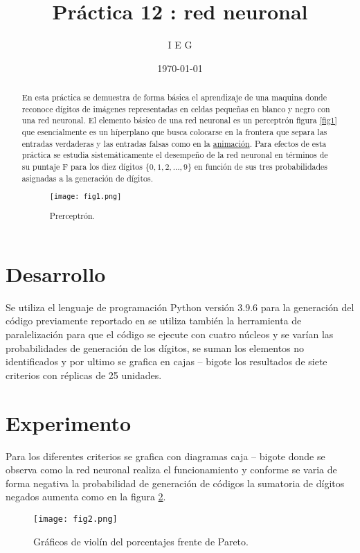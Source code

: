 \documentclass{article}
\author{I E G} %
\title{Práctica 12 : red neuronal} %
\date{\today}
\begin{document}

\maketitle %

\begin{abstract} %

En esta práctica se demuestra de forma básica el aprendizaje de una maquina donde reconoce dígitos de imágenes representadas en celdas pequeñas en blanco y negro con una red neuronal.
El elemento básico de una red neuronal es un perceptrón figura \ref{fig1} que esencialmente es un híperplano \cite{elis12} que busca colocarse en la frontera que separa las entradas verdaderas y las entradas falsas como en la \href{https://github.com/IsaacEstrada159/simulacion/blob/master/p12/p12p.gif}{animación}. Para efectos de esta práctica se estudia sistemáticamente el desempeño de la red neuronal en términos de su puntaje F para los diez dígitos $\{0, 1, 2, \ldots, 9\}$ en función de sus tres probabilidades asignadas a la generación de dígitos.



\begin{figure} [h!]%
    \centering
    \texttt{[image: fig1.png]} %
    \caption{Prerceptrón.}
    \label{fig1}
\end{figure}

\end{abstract}


\section{Desarrollo}
Se utiliza el lenguaje de programación Python versión 3.9.6 para la generación del código previamente reportado en \cite{elis12} se utiliza también la herramienta de paralelización para que el código se ejecute con cuatro núcleos y se varían las probabilidades de generación de los dígitos, se suman los elementos no identificados y por ultimo se grafica en cajas – bigote los resultados de siete criterios con réplicas de 25 unidades.



  

\section{Experimento}
Para los diferentes criterios se grafica con diagramas caja – bigote donde se observa como la red neuronal realiza el funcionamiento y conforme se varia de forma negativa la probabilidad de generación de códigos la sumatoria de dígitos negados aumenta como en la figura \ref{fig2}.
\begin{figure} [h!]%
    \centering
    \texttt{[image: fig2.png]} %
    \caption{Gráficos de violín del porcentajes frente de Pareto.}
    \label{fig2}
\end{figure}
\end{document}
